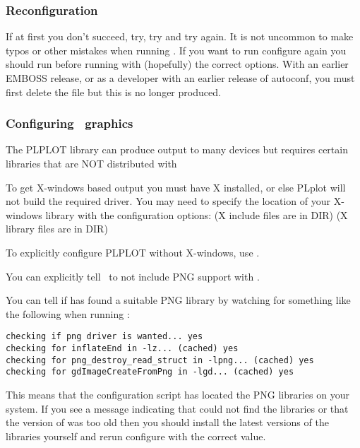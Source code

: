 \documentclass{report}
\begin{document}
\subsubsection{Reconfiguration}

If at first you don't succeed, try, try and try again. It is not
uncommon to make typos or other mistakes when running
. If you want to run configure again you should
run  before running  with
(hopefully) the correct options. With an earlier EMBOSS release, or as
a developer with an earlier release of autoconf, you must first delete
the file  but this is no longer produced.

\subsubsection{Configuring \EMBOSS\ graphics}

The PLPLOT library can produce output to many devices but requires
certain libraries that are NOT distributed with \EMBOSS

To get X-windows based output you must have X installed, or else PLplot
will not build the required driver. You may need to specify the
location of your X-windows library with the configuration options:
 (X include files are in DIR)
 (X library files are in DIR)

To explicitly configure PLPLOT without X-windows, use .

You can explicitly tell \EMBOSS\ to not include PNG support with
.

 You can tell if  has
found a suitable PNG library by watching for something like the
following when running :

\begin{verbatim}
checking if png driver is wanted... yes
checking for inflateEnd in -lz... (cached) yes
checking for png_destroy_read_struct in -lpng... (cached) yes
checking for gdImageCreateFromPng in -lgd... (cached) yes
\end{verbatim}

This means that the configuration script has located the PNG libraries
on your system. If you see a message indicating that
 could not find the libraries or that the version
of  was too old then you should install the latest
versions of the libraries yourself and rerun configure with the
correct  value.
\end{document}
